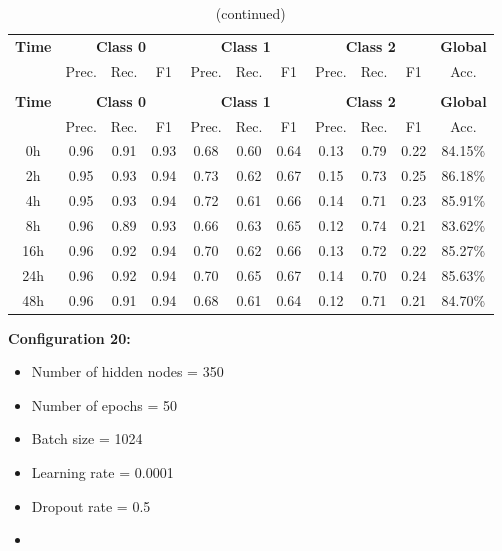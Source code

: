 \documentclass[12pt,oneside]{book} %
\begin{document}
\setlength\LTleft{1cm}
\begin{longtable}{ c ccc ccc ccc c}
\caption{Performance metrics of the LNN model for configuration 19} \\
\toprule
\textbf{Time} & \multicolumn{3}{c}{\textbf{Class 0}} & \multicolumn{3}{c}{\textbf{Class 1}} & \multicolumn{3}{c}{\textbf{Class 2}} & \textbf{Global} \\
               & Prec. & Rec. & F1  & Prec. & Rec. & F1   & Prec. & Rec. & F1  & Acc. \\
\midrule
\endfirsthead

\caption[]{(continued)} \\
\toprule
\textbf{Time} & \multicolumn{3}{c}{\textbf{Class 0}} & \multicolumn{3}{c}{\textbf{Class 1}} & \multicolumn{3}{c}{\textbf{Class 2}} & \textbf{Global} \\
               & Prec. & Rec. & F1  & Prec. & Rec. & F1   & Prec. & Rec. & F1  & Acc. \\
\midrule
\endhead

\bottomrule
\endfoot

\bottomrule
\endlastfoot

0h   & 0.96  & 0.91 & 0.93 & 0.68  & 0.60 & 0.64  & 0.13  & 0.79 & 0.22 & 84.15\% \\
2h   & 0.95  & 0.93 & 0.94 & 0.73  & 0.62 & 0.67  & 0.15  & 0.73 & 0.25 & 86.18\% \\
4h   & 0.95  & 0.93 & 0.94 & 0.72  & 0.61 & 0.66  & 0.14  & 0.71 & 0.23 & 85.91\% \\
8h   & 0.96  & 0.89 & 0.93 & 0.66  & 0.63 & 0.65  & 0.12  & 0.74 & 0.21 & 83.62\% \\
16h  & 0.96  & 0.92 & 0.94 & 0.70  & 0.62 & 0.66  & 0.13  & 0.72 & 0.22 & 85.27\% \\
24h  & 0.96  & 0.92 & 0.94 & 0.70  & 0.65 & 0.67  & 0.14  & 0.70 & 0.24 & 85.63\% \\
48h  & 0.96  & 0.91 & 0.94 & 0.68  & 0.61 & 0.64  & 0.12  & 0.71 & 0.21 & 84.70\% \\
\end{longtable}

\noindent \textbf{Configuration 20:}
\begin{multicols}{2}
    \begin{itemize}
        \item Number of hidden nodes = 350
        \item Number of epochs = 50
        \item Batch size = 1024
    \end{itemize}
    \begin{itemize}
         \item Learning rate = 0.0001
         \item Dropout rate  = 0.5
         \item[\hspace{0pt}]
    \end{itemize}
\end{multicols}
\end{document}
